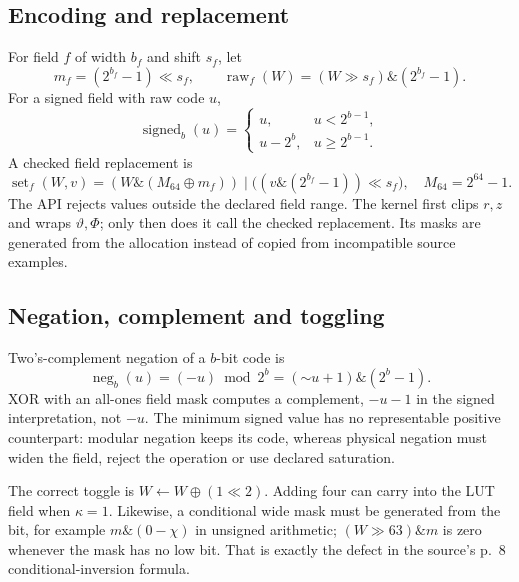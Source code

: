 \documentclass[11pt,a4paper]{article}
\numberwithin{equation}{section}
\begin{document}
\subsection{Encoding and replacement}
For field $f$ of width $b_f$ and shift $s_f$, let
\begin{equation}
 m_f=(2^{b_f}-1)\ll s_f,\qquad
\operatorname{raw}_f(W)=(W\gg s_f)\mathbin{\&}(2^{b_f}-1).
\end{equation}
For a signed field with raw code $u$,
\begin{equation}
\operatorname{signed}_{b}(u)=
\begin{cases}u,&u<2^{b-1},\\u-2^b,&u\ge2^{b-1}.
\end{cases}
\end{equation}
A checked field replacement is
\begin{equation}
\operatorname{set}_f(W,v)=
(W\mathbin{\&}(M_{64}\mathbin{\oplus}m_f))\mathbin{|}
\bigl((v\mathbin{\&}(2^{b_f}-1))\ll s_f\bigr),\quad M_{64}=2^{64}-1.
\end{equation}
The API rejects values outside the declared field range. The kernel first clips $r,z$ and wraps $\vartheta,\Phi$; only then does it call the checked replacement. Its masks are generated from the allocation instead of copied from incompatible source examples.

\subsection{Negation, complement and toggling}
Two's-complement negation of a $b$-bit code is
\begin{equation}
\operatorname{neg}_b(u)=(-u)\bmod2^b=(\mathord\sim u+1)\mathbin{\&}(2^b-1).
\end{equation}
XOR with an all-ones field mask computes a complement, $-u-1$ in the signed interpretation, not $-u$. The minimum signed value has no representable positive counterpart: modular negation keeps its code, whereas physical negation must widen the field, reject the operation or use declared saturation.

The correct toggle is $W\leftarrow W\oplus(1\ll2)$. Adding four can carry into the LUT field when $\kappa=1$. Likewise, a conditional wide mask must be generated from the bit, for example $m\mathbin{\&}(0-\chi)$ in unsigned arithmetic; $(W\gg63)\mathbin{\&}m$ is zero whenever the mask has no low bit. That is exactly the defect in the source's p.~8 conditional-inversion formula.
\end{document}
